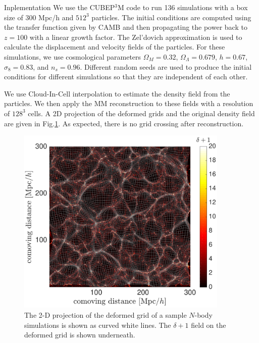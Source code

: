 \begin{section}{Inplementation}
  \label{sec:simulation}
  We use the \textsc{CUBEP$^3$M} code \cite{bib:Harnois2013} to run
  136 simulations with a box size of 300 Mpc/h and $512^3$ particles.
  The initial conditions are computed using the transfer function
  given by CAMB \cite{bib:Lewis2000} and then propagating the power
  back to $z=100$ with a linear growth factor.  The Zel'dovich
  approximation is used to calculate the displacement and velocity
  fields of the particles.  For these simulations, we use cosmological
  parameters $\Omega_M=0.32$, $\Omega_{\Lambda}=0.679$, $h=0.67$,
  $\sigma_8=0.83$, and $n_s=0.96$.  Different random seeds are used to
  produce the initial conditions for different simulations so that
  they are independent of each other.

  We use Cloud-In-Cell interpolation to estimate the density field
  from the particles.  We then apply the MM reconstruction to these
  fields with a resolution of $128^3$ cells.  A 2D projection of the
  deformed grids and the original density field are given in
  Fig.\ref{fig:simandrec}.  As expected, there is no grid crossing
  after reconstruction.


\begin{figure}[t!]
  \centering
  \includegraphics[width=0.9\textwidth]{fig1.pdf}
  \caption{ The 2-D projection of the deformed grid of a sample
    $N$-body simulations is shown as curved white lines. The
    $\delta+1$ field on the deformed grid is shown underneath.}
 \label{fig:simandrec}
\end{figure}

\end{section}

